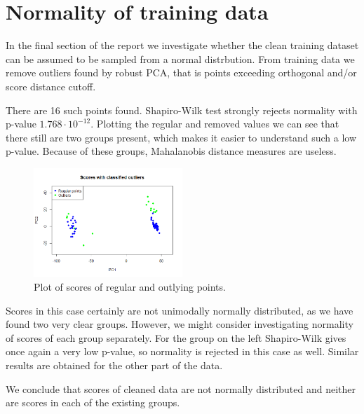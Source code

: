 \documentclass[12pt]{article}
\begin{document}
\section{Normality of training data}
In the final section of the report we investigate whether the clean training dataset can be assumed to be sampled from a normal distrbution.
From training data we remove outliers found by robust PCA, that is points exceeding orthogonal and/or score distance cutoff.

There are 16 such points found. Shapiro-Wilk test strongly rejects normality with p-value
$1.768\cdot 10^{-12}.$ Plotting the regular and removed values we can see that there still are two groups present, which makes it
easier to understand such a low p-value. Because of these groups, Mahalanobis distance measures are useless.
\begin{figure}[ht!]
  \begin{center}
    \centering
      \includegraphics[width=0.5\textwidth]{../images/project1/regularAndOutliers.png}
      \caption{Plot of scores of regular and outlying points.}
      \label{fig:regularAndOutliers}
  \end{center}
\end{figure}

Scores in this case certainly are not unimodally normally distributed, as we have found two very clear groups. However, we might consider investigating normality of scores of
each group separately. For the group on the left Shapiro-Wilk gives once again a very low p-value, so normality is rejected in this case as well.
Similar results are obtained for the other part of the data.

We conclude that scores of cleaned data are not normally distributed and neither are scores in each of the existing groups.
\end{document}
